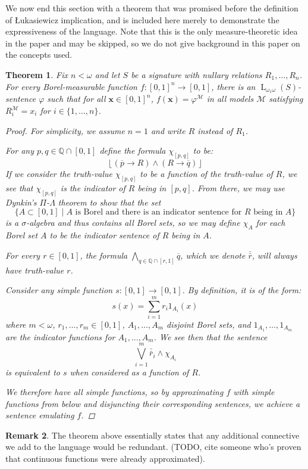 \documentclass{amsart}
\newtheorem{theorem}{Theorem}[section]
\theoremstyle{definition}
\newtheorem{remark}[theorem]{Remark}
\numberwithin{equation}{theorem}
\renewcommand{\phi}{\varphi}
\newcommand{\Q}{\mathbb{Q}}
\newcommand{\V}{\mathbf}
\newcommand{\where}{\mid}
\newcommand{\strict}[1]{{\left\lfloor#1\right\rfloor}}
\newcommand{\rat}[1]{{\overline{#1}}}
\newcommand{\num}[1]{{\bar{\bar{#1}}}}
\newcommand{\narrow}[1]{\xrightarrow{#1}}
\renewcommand{\to}{\narrow{}}
\newcommand{\baselang}{\operatorname{L}}
\newcommand{\lang}{\baselang_{\omega_1\omega}}
\begin{document}
We now end this section with a theorem that was promised before the definition of {\L}ukasiewicz implication, and is included here merely to demonstrate the expressiveness of the language.
Note that this is the only measure-theoretic idea in the paper and may be skipped, so we do not give background in this paper on the concepts used.
\begin{theorem}\label{thm:expressive-logic}
  Fix $n<\omega$ and let $S$ be a signature with nullary relations $R_1,\dots,R_n$.
  For every Borel-measurable function $f:[0,1]^n\to[0,1]$, there is an $\lang(S)$-sentence $\phi$ such that for all $\V x\in[0,1]^n$, $f(\V x)=\phi^\mathcal M$ in all models $\mathcal M$ satisfying $R^\mathcal M_i=x_i$ for $i\in\{1,\dots,n\}$.
  \begin{proof}
    For simplicity, we assume $n=1$ and write $R$ instead of $R_1$.
    
    For any $p,q\in\Q\cap[0,1]$ define the formula $\chi_{[p,q]}$ to be:
    \[
      \strict{(\rat p\to R)\wedge (R\to\rat q)}
    \]
    If we consider the truth-value $\chi_{[p,q]}$ to be a function of the truth-value of $R$, we see that $\chi_{[p,q]}$ is the indicator of $R$ being in $[p,q]$.
    From there, we may use Dynkin's $\Pi$-$\Lambda$ theorem to show that the set
    \[
      \{A\subset[0,1]\where \text{$A$ is Borel and there is an indicator sentence for $R$ being in $A$}\}
    \]
    is a $\sigma$-algebra and thus contains all Borel sets, so we may define $\chi_A$ for each Borel set $A$ to be the indicator sentence of $R$ being in $A$.
    
    For every $r\in[0,1]$, the formula $\bigwedge_{q\in\Q\cap[r,1]}\rat q$, which we denote $\num r$, will always have truth-value $r$.
    
    Consider any simple function $s:[0,1]\to[0,1]$.
    By definition, it is of the form:
    \[
      s(x)=\sum_{i=1}^m r_i 1_{A_i}(x)
    \]
    where $m<\omega$, $r_1,\dots,r_m\in[0,1]$, $A_1,\dots,A_m$ disjoint Borel sets, and $1_{A_1},\dots,1_{A_m}$ are the indicator functions for $A_1,\dots,A_m$.
    We see then that the sentence
    \[
      \bigvee_{i=1}^m \num{r}_i\wedge\chi_{A_i}
    \]
    is equivalent to $s$ when considered as a function of $R$.
    
    We therefore have all simple functions, so by approximating $f$ with simple functions from below and disjuncting their corresponding sentences, we achieve a sentence emulating $f$.
  \end{proof}
\end{theorem}
\begin{remark}
  The theorem above essentially states that any additional connective we add to the language would be redundant.
  (TODO, cite someone who's proven that continuous functions were already approximated).
\end{remark}
\end{document}
